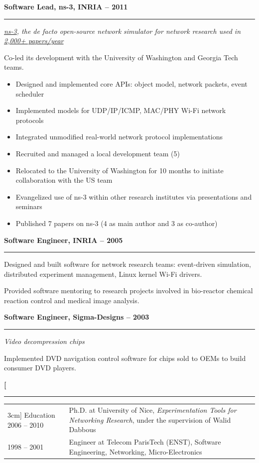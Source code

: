\documentclass[a4paper,11pt]{article}
\newcommand{\styleRub}[1]{\needspace{6\baselineskip}\noindent\textbf{\large #1}\par\nopagebreak}
\newcommand{\indentStd}{\noindent\hspace*{10pt}}
\newcommand{\job}[2]{#1\hfill{\normalsize\mdseries #2}}
\newcommand{\company}[1]{\textit{#1}\par\medskip}
\newenvironment{rubrique}[2][\linewidth]%
{\styleRub{#2}%
\vspace{-0.6\baselineskip}\noindent\rule{\textwidth}{0.5mm}\par\nopagebreak
\setlength{\lenB}{#1}%
\setlength{\lenC}{\linewidth}%
\addtolength{\lenC}{-\lenA}%
\addtolength{\lenC}{-\lenB}%
\addtolength{\lenC}{-34pt}%
\ifdim\lenB=\linewidth\addtolength{\lenB}{-22pt}\fi%
\indentStd\begin{tabular}[t]{p{\lenB}p{\lenC}}}
{\end{tabular}}
\newenvironment{sectionblock}[1]
{\styleRub{#1}\vspace{-0.6\baselineskip}\noindent\rule{\textwidth}{0.5mm}\par\nopagebreak
\begin{list}{}{\setlength{\leftmargin}{10pt}\setlength{\topsep}{0pt}}\item\relax}
{\end{list}}
\newlength{\lenA} %
\newlength{\lenB} %
\newlength{\lenC} %
\begin{document}
\vspace{0.45cm}
\begin{sectionblock}{\job{Software Lead, ns-3, INRIA}{2005 -- 2011}}
\company{\href{https://www.nsnam.org}{ns-3}, the de facto open-source network simulator for network research used in
\href{https://www.cutebugs.net/ns-3-usage}{2,000+ papers/year}}

Co-led its development with the University of Washington and Georgia Tech teams.
 
  \begin{itemize}
  \item Designed and implemented core APIs: object model, network packets, event scheduler
  \item Implemented models for UDP/IP/ICMP, MAC/PHY Wi-Fi network protocols
  \item Integrated unmodified real-world network protocol implementations
  \item Recruited and managed a local development team (5)
  \item Relocated to the University of Washington for 10 months to initiate collaboration with the US team
  \item Evangelized use of ns-3 within other research institutes via
    presentations and seminars
  \item Published 7 papers on ns-3 (4 as main author and 3 as co-author)
  \end{itemize}

\end{sectionblock}

\vspace{0.45cm}
\begin{sectionblock}{\job{Software Engineer, INRIA}{2003 -- 2005}}

  Designed and built software for network research teams: event-driven simulation,
  distributed experiment management, Linux kernel Wi-Fi drivers.

  Provided software mentoring to research projects involved in 
  bio-reactor chemical reaction control and medical image analysis.

\end{sectionblock}

\vspace{0.45cm}
\begin{sectionblock}{\job{Software Engineer, Sigma-Designs}{2001 -- 2003}}
\company{Video decompression chips}

  Implemented DVD navigation control software for chips
  sold to OEMs to build consumer DVD players.

\end{sectionblock}

\vspace{0.45cm}
\begin{rubrique} [3cm] {Education}
  2006 -- 2010 & Ph.D. at University of Nice,
  \emph{Experimentation Tools for Networking Research}, under the supervision of Walid Dabbous\\
  1998 -- 2001 & Engineer at Telecom ParisTech (ENST), Software Engineering, Networking, Micro-Electronics \\
\end{rubrique}
\end{document}
